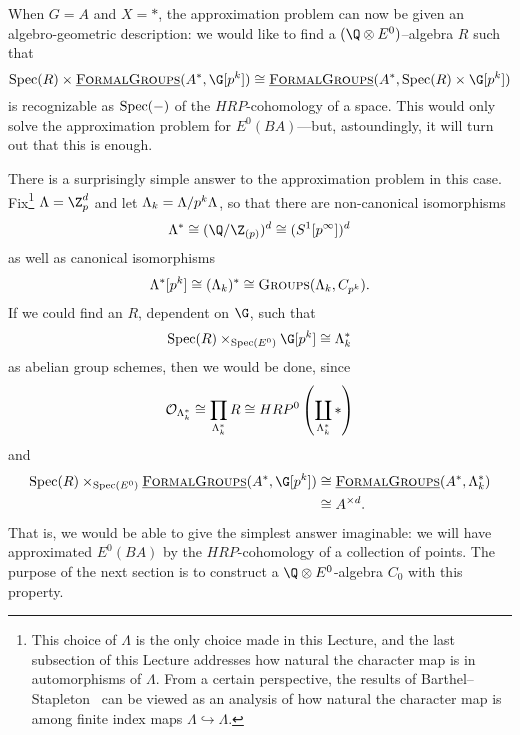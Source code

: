 When \(G = A\) and \(X = *\), the approximation problem can now be given an algebro-geometric description: we would like to find a \((\Q \otimes E^0)\)--algebra \(R\) such that 
\[
\Spec(R) \times \InternalHom{FormalGroups}(A^*, \G[p^k]) \cong  \InternalHom{FormalGroups}(A^*, \Spec(R) \times \G[p^k])
\]
is recognizable as \(\operatorname{Spec}(-)\) of the \(HRP\)-cohomology of a space. This would only solve the approximation problem for \(E^0(BA)\)---but, astoundingly, it will turn out that this is enough.

There is a surprisingly simple answer to the approximation problem in this case.  Fix\footnote{This choice of \(\Lambda\) is the only choice made in this Lecture, and the last subsection of this Lecture addresses how natural the character map is in automorphisms of \(\Lambda\).  From a certain perspective, the results of Barthel--Stapleton~\cite{BarthelStapleton} can be viewed as an analysis of how natural the character map is among finite index maps \(\Lambda \hookrightarrow \Lambda\).} \(\Lambda = \Z_{p}^{d}\) and let \(\Lambda_k = \Lambda/p^k\Lambda\), so that there are non-canonical isomorphisms
\[
\Lambda^* \cong (\Q/\Z_{(p)})^d \cong (S^1[p^{\infty}])^d
\] 
as well as canonical isomorphisms
\[
\Lambda^*[p^k] \cong (\Lambda_{k})^* \cong \normalfont\textsc{Groups}(\Lambda_k, C_{p^k}).
\]
If we could find an \(R\), dependent on \(\G\), such that
\[
\Spec(R) \times_{\Spec(E^0)} \G[p^k] \cong \Lk^*
\]
as abelian group schemes, then we would be done, since
\[
\mathcal{O}_{\Lambda_k^*} \cong \prod_{\Lambda_k^*} R \cong HRP^0\left(\coprod_{\Lambda_k^*} \ast\right)
\]
and
\begin{align*}
\Spec(R) \times_{\Spec(E^0)} \InternalHom{FormalGroups}(A^*, \G[p^k]) & \cong \InternalHom{FormalGroups}(A^*, \Lambda_{k}^*) \\
& \cong A^{\times d}.
\end{align*}
That is, we would be able to give the simplest answer imaginable: we will have approximated \(E^0(BA)\) by the \(HRP\)-cohomology of a collection of points. The purpose of the next section is to construct a \(\Q \otimes E^0\)-algebra \(C_0\) with this property.




